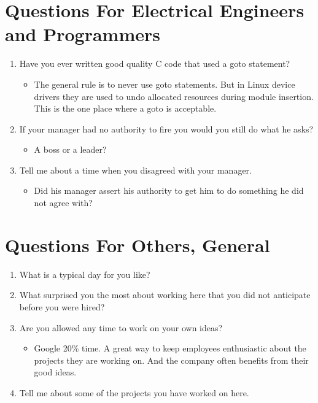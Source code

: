 \documentclass{article}
\begin{document}
\section{Questions For Electrical Engineers and Programmers}

\begin{enumerate}

\item Have you ever written good quality C code that used a goto statement?
	\begin{itemize}
	\item The general rule is to never use goto statements.  But in
		Linux device drivers they are used to undo allocated resources
		during module insertion.  This is the one place where a goto is
		acceptable.
	\end{itemize}

\item If your manager had no authority to fire you would you still do
	what he asks?
	\begin{itemize}
	\item A boss or a leader?
	\end{itemize}

\item Tell me about a time when you disagreed with your manager.
	\begin{itemize}
	\item Did his manager assert his authority to get him to do something he
		did not agree with?
	\end{itemize}

\end{enumerate}

\section{Questions For Others, General}

\begin{enumerate}

\item What is a typical day for you like?

\item What surprised you the most about working here that you did
not anticipate before you were hired?

\item Are you allowed any time to work on your own ideas?
	\begin{itemize}
	\item Google 20\% time.  A great way to keep employees enthusiastic
		about the projects they are working on.  And the company often
		benefits from their good ideas.
	\end{itemize}

\item Tell me about some of the projects you have worked on here.

\end{enumerate}
\end{document}
